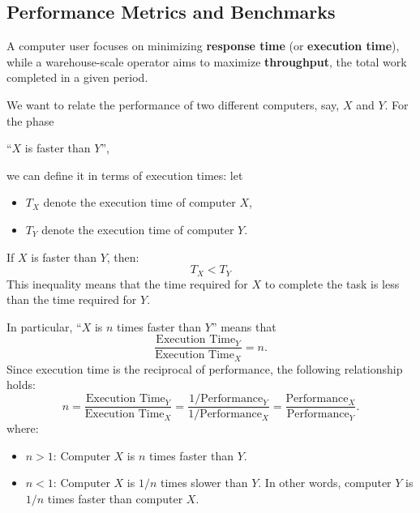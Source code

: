 \subsection{Performance Metrics and Benchmarks}
A computer user focuses on minimizing \textbf{response time} (or \textbf{execution time}), while a warehouse-scale operator aims to maximize \textbf{throughput}, the total work completed in a given period.

We want to relate the performance of two different computers, say, $X$ and $Y$. For the phase \begin{center}
``$X$ is faster than $Y$'',
\end{center} we can define it in terms of execution times: let
\begin{itemize}
	\item \( T_X \) denote the execution time of computer \( X \),
	\item \( T_Y \) denote the execution time of computer \( Y \).
\end{itemize} If \( X \) is faster than \( Y \), then:
\[
T_X < T_Y
\]
This inequality means that the time required for \( X \) to complete the task is less than the time required for \( Y \).

In particular, ``$X$ is $n$ times faster than $Y$'' means that \[
\frac{\text{Execution Time}_Y}{\text{Execution Time}_X}=n.
\] Since execution time is the reciprocal of performance, the following relationship holds:
\[
n = \frac{\text{Execution Time}_Y}{\text{Execution Time}_X} =\frac{\displaystyle 1/\text{Performance}_Y}{\displaystyle 1/\text{Performance}_X}= \frac{\text{Performance}_X}{\text{Performance}_Y}.
\]
where: \begin{itemize}
	\item \( n > 1 \): Computer \( X \) is \( n \) times faster than \( Y \).
	\item \( n < 1 \): Computer \( X \) is \( 1/n\) times slower than \( Y\). In other words, computer $Y$ is $1/n$ times faster than computer $X$.
\end{itemize} 

